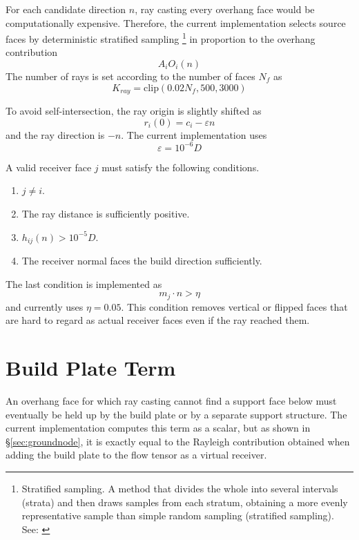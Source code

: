 \documentclass[11pt,a4paper]{article}
\begin{document}
For each candidate direction $n$, ray casting every overhang face would be computationally expensive.
Therefore, the current implementation selects source faces by deterministic stratified sampling%
\footnote{Stratified sampling. A method that divides the whole into several intervals (strata) and then draws samples from each stratum,
obtaining a more evenly representative sample than simple random sampling (stratified sampling). See: \cite{cochran1977}}
in proportion to the overhang contribution
\begin{equation}
A_iO_i(n)
\end{equation}
The number of rays is set according to the number of faces $N_f$ as
\begin{equation}
K_{ray}
=
\mathrm{clip}(0.02N_f,500,3000)
\end{equation}

To avoid self-intersection, the ray origin is slightly shifted as
\begin{equation}
r_i(0)=c_i-\varepsilon n
\end{equation}
and the ray direction is $-n$.
The current implementation uses
\begin{equation}
\varepsilon = 10^{-6}D
\end{equation}

A valid receiver face $j$ must satisfy the following conditions.

\begin{enumerate}
\item $j\ne i$.
\item The ray distance is sufficiently positive.
\item $h_{ij}(n)>10^{-5}D$.
\item The receiver normal faces the build direction sufficiently.
\end{enumerate}

The last condition is implemented as
\begin{equation}
m_j\cdot n > \eta
\end{equation}
and currently uses $\eta=0.05$.
This condition removes vertical or flipped faces that are hard to regard as actual receiver faces even if the ray reached them.

\section{Build Plate Term}

An overhang face for which ray casting cannot find a support face below must eventually be held up by the build plate or by a separate support structure.
The current implementation computes this term as a scalar, but
as shown in \S\ref{sec:groundnode}, it is exactly equal to the Rayleigh contribution obtained when adding the build plate to the flow tensor as a virtual receiver.
\end{document}
